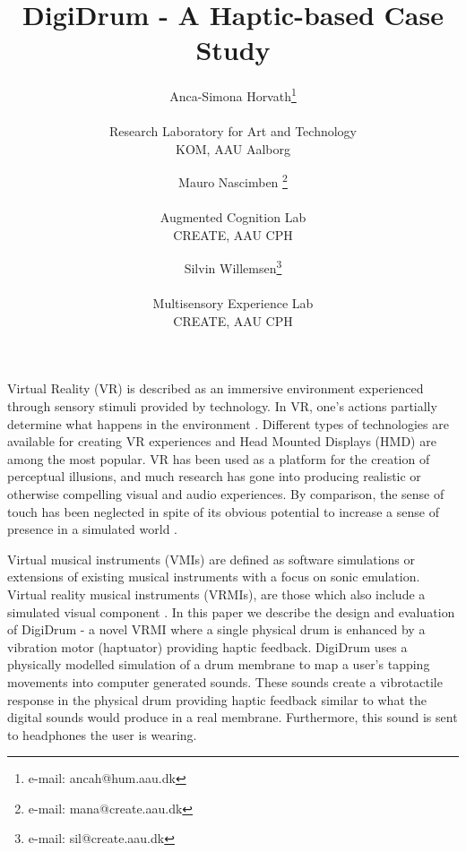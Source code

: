 \documentclass{vgtc}
\title{DigiDrum - A Haptic-based Case Study}
\author{Anca-Simona Horvath\thanks{e-mail: ancah@hum.aau.dk}\\ %
        \parbox{1.4in}{\scriptsize \centering Research Laboratory for Art and Technology \\ KOM, AAU Aalborg} %
\and Mauro Nascimben \thanks{e-mail: mana@create.aau.dk}\\ %
     \parbox{1.4in}{\scriptsize \centering Augmented Cognition Lab \\ CREATE, AAU CPH }%
\and Silvin Willemsen\thanks{e-mail: sil@create.aau.dk}\\ %
     \parbox{1.4in}{\scriptsize \centering Multisensory Experience Lab \\ CREATE, AAU CPH}}
\begin{document}


\maketitle
Virtual Reality (VR) is described as an immersive environment experienced through sensory stimuli provided by technology. In VR, one's actions partially determine what happens in the environment \cite{Serafin:2017}. Different types of technologies are available for creating VR experiences and Head Mounted Displays (HMD) are among the most popular. VR has been used as a platform for the creation of perceptual illusions, and much research has gone into producing realistic or otherwise compelling visual and audio experiences. By comparison, the sense of touch has been neglected in spite of its obvious potential to increase a sense of presence in a simulated world \cite{Serafin:2017}.

Virtual musical instruments (VMIs) are defined as software simulations or extensions of existing musical instruments with a focus on sonic emulation. Virtual reality musical instruments (VRMIs), are those which also include a simulated visual component \cite{Serafin:2016}. In this paper we describe the design and evaluation of DigiDrum - a novel VRMI where a single physical drum is enhanced by a vibration motor (haptuator) providing haptic feedback. DigiDrum uses a physically modelled simulation of a drum membrane to map a user's tapping movements into computer generated sounds. These sounds create a vibrotactile response in the physical drum providing haptic feedback similar to what the digital sounds would produce in a real membrane. Furthermore, this sound is sent to headphones the user is wearing.  %
\end{document}
